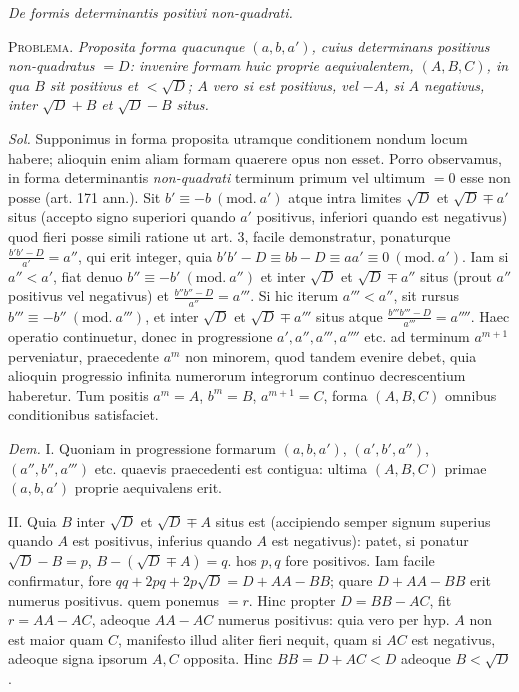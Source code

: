 \begin{center}
\textit{De formis determinantis positivi non-quadrati.}
\end{center}

\textsc{Problema.} \textit{Proposita forma quacunque $(a,b,a')$, cuius determinans positivus non-quadratus $=D$: invenire formam huic proprie aequivalentem, $(A,B,C)$, in qua $B$ sit positivus et $<\surd D$; $A$ vero si est positivus, vel $-A$, si $A$ negativus, inter $\surd D+B$ et $\surd D-B$ situs.}

\textit{Sol.} Supponimus in forma proposita utramque conditionem nondum locum habere; alioquin enim aliam formam quaerere opus non esset. Porro observamus, in forma determinantis \textit{non-quadrati} terminum primum vel ultimum $=0$ esse non posse (art. 171 ann.). Sit $b'\equiv-b\ (\mathrm{mod.}\ a')$ atque intra limites $\surd D$ et $\surd D\mp a'$ situs (accepto signo superiori quando $a'$ positivus, inferiori quando est negativus) quod fieri posse simili ratione ut art. 3, facile demonstratur, ponaturque $\frac{b'b'-D}{a'}=a''$, qui erit integer, quia $b'b'-D\equiv bb-D\equiv aa'\equiv0\ (\mathrm{mod.}\ a')$. Iam si $a''<a'$, fiat denuo $b''\equiv-b'\ (\mathrm{mod.}\ a'')$ et inter $\surd D$ et $\surd D\mp a''$ situs (prout $a''$ positivus vel negativus) et $\frac{b''b''-D}{{a''}}=a'''$. Si hic iterum $a'''<a''$, sit rursus $b'''\equiv-b''\ (\mathrm{mod.}\ a''')$, et inter $\surd D$ et $\surd D\mp a'''$ situs atque $\frac{b'''b'''-D}{a'''}=a''''$. Haec operatio continuetur, donec in progressione $a',a'',a''',a''''$ etc. ad terminum $a^{m+1}$ perveniatur, praecedente $a^m$ non minorem, quod tandem evenire debet, quia alioquin progressio infinita numerorum integrorum continuo decrescentium haberetur. Tum positis $a^m=A$, $b^m=B$, $a^{m+1}=C$, forma $(A,B,C)$ omnibus conditionibus satisfaciet.

\textit{Dem.} I. Quoniam in progressione formarum $(a,b,a')$, $(a',b',a'')$, $(a'',b'',a''')$ etc. quaevis praecedenti est contigua: ultima $(A,B,C)$ primae $(a,b,a')$ proprie aequivalens erit.

II. Quia $B$ inter $\surd D$ et $\surd D\mp A$ situs est (accipiendo semper signum superius quando $A$ est positivus, inferius quando $A$ est negativus): patet, si ponatur $\surd D-B=p$, $B-(\surd D\mp A)=q$. hos $p,q$ fore positivos. Iam facile confirmatur, fore $qq+2pq+2p\surd D=D+AA-BB$; quare $D+AA-BB$ erit numerus positivus. quem ponemus $=r$. Hinc propter $D=BB-AC$,
fit $r=AA-AC$, adeoque $AA-AC$ numerus positivus: quia vero per hyp. $A$ non est maior quam $C$, manifesto illud aliter fieri nequit, quam si $AC$ est negativus, adeoque signa ipsorum $A,C$ opposita. Hinc $BB=D+AC<D$ adeoque $B<\surd D$.

